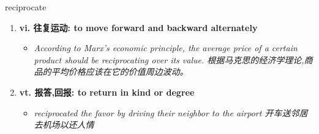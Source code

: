 
\begin{frame}
{\huge reciprocate}
\begin{center}
\begin{enumerate}\Large
  \item \textbf{vi. 往复运动: to move forward and backward alternately}
  \begin{itemize}
    \item \em{\Large{According to Marx’s economic principle, the average price of a certain product should be reciprocating over its value. 根据马克思的经济学理论,商品的平均价格应该在它的价值周边波动。}}
  \end{itemize}
  \item \textbf{vt. 报答,回报: to return in kind or degree}
  \begin{itemize}
    \item \em{\Large{reciprocated the favor by driving their neighbor to the airport 开车送邻居去机场以还人情}}
  \end{itemize}
\end{enumerate}
\end{center}
\end{frame}
